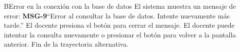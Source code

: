 \begin{UCtrayectoriaA}{B}{Error en la conexión con la base de datos}
\UCpaso El sistema muestra un mensaje de error: {\bf MSG-9}{``Error al consultar la base de datos. Intente nuevamente más tarde.''}
\UCpaso[\UCactor] El docente presiona el botón  para cerrar el mensaje.
\UCpaso[\UCactor] El docente puede intentar la consulta nuevamente o presionar el botón  para volver a la pantalla anterior.
\UCpaso Fin de la trayectoria alternativa.
\end{UCtrayectoriaA}


